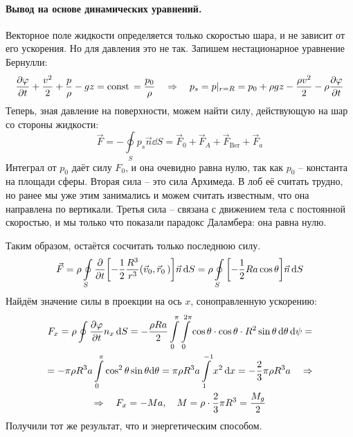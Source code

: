 \paragraph{Вывод на основе динамических уравнений. } Векторное поле жидкости определяется только скоростью шара, и не зависит от его ускорения. Но для давления это не так. Запишем нестационарное
уравнение Бернулли:
\begin{equation}
    \pdv{\varphi}{t}+\frac{v^2}{2} + \frac{p}{\rho} - gz = \mathrm{const}\, =
    \frac{p_0}{\rho} 
    \quad\Rightarrow\quad 
    p_s = p |_{r=R} = p_0 +\rho g z -\frac{\rho v^2}{2} - \rho\pdv{\varphi}{t}
\end{equation}
Теперь, зная давление на поверхности, можем найти силу, действующую на шар со стороны жидкости:
\begin{equation}
    \vec{F} = -\oint\limits_S p_s \vec{n} \dd{S}=
    \vec{F}_0 + \vec{F}_A + \vec{F}_\text{Ber} + \vec{F}_a
\end{equation}
Интеграл от $p_0$ даёт силу $F_0$, и она очевидно равна нулю, так как $p_0$ -- константа на площади сферы.
Вторая сила -- это сила Архимеда. В лоб её считать трудно, но ранее мы уже этим занимались и можем считать известным, что она направлена по вертикали.
Третья сила -- связана с движением тела с постоянной скоростью, и мы только что показали парадокс Даламбера: она равна нулю.

Таким образом, остаётся сосчитать только последнюю силу.
\begin{equation}
    \vec{F} = \rho\oint\limits_S \pdv{t}\qty[
    -\frac{1}{2} \frac{R^3}{r^3} (\vec{v}_0,\vec{r}_0\,)
    ]\vec{n} \dd{S} = 
    \rho\oint\limits_S \qty[
    -\frac{1}{2} R a\cos\theta 
    ] \vec{n} \dd{S}
\end{equation}
Найдём значение силы в проекции на ось $x$, соноправленную ускорению:
\begin{gather}
    F_x = \rho\oint\pdv{\varphi}{t}n_x \dd{S} =
    -\frac{\rho R a}{2} \int\limits_0^\pi \int\limits_0^{2\pi}
    \cos\theta \cdot \cos\theta \cdot R^2\sin\theta \dd{\theta} \dd{\psi}=\\=
    -\pi\rho R^3 a \int\limits_0^\pi \cos^2\theta \sin \theta \dd\theta=
    \pi\rho R^3 a \int\limits_{1}^{-1} x^2 \dd{x} = -\frac{2}{3}\pi\rho R^3 a 
    \quad\Rightarrow \\ 
    \Rightarrow\quad 
    F_x = -Ma, \quad M = \rho\cdot \frac{2}{3}\pi R^3 = \frac{M_g}{2}
\end{gather}
Получили тот же результат, что и энергетическим способом.

